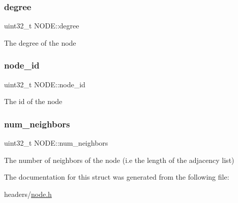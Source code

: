 \subsubsection{\texorpdfstring{degree}{degree}}
{\footnotesize\ttfamily uint32\+\_\+t N\+O\+D\+E\+::degree}

The degree of the node \mbox{\label{structNODE_a5a4598006a4940d545ec4e8fda905826}} 
\subsubsection{\texorpdfstring{node\+\_\+id}{node\_id}}
{\footnotesize\ttfamily uint32\+\_\+t N\+O\+D\+E\+::node\+\_\+id}

The id of the node \mbox{\label{structNODE_a34195e71189dd8b3b5d9988f0ad9416a}} 
\subsubsection{\texorpdfstring{num\+\_\+neighbors}{num\_neighbors}}
{\footnotesize\ttfamily uint32\+\_\+t N\+O\+D\+E\+::num\+\_\+neighbors}

The number of neighbors of the node (i.\+e the length of the adjacency list) 

The documentation for this struct was generated from the following file\+:\begin{DoxyCompactItemize}
\item 
headers/\hyperlink{node_8h}{node.\+h}\end{DoxyCompactItemize}
